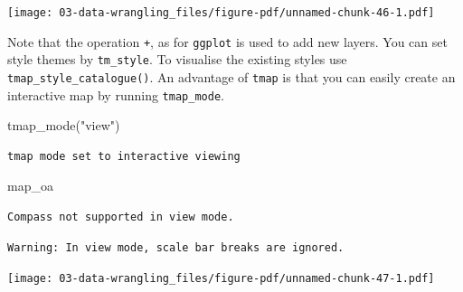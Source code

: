 \documentclass[
  letterpaper,
  DIV=11,
  numbers=noendperiod,
  oneside]{scrreprt}
\newenvironment{Shaded}{\begin{snugshade}}{\end{snugshade}}
\newcommand{\FunctionTok}[1]{\textcolor[rgb]{0.28,0.35,0.67}{#1}}
\newcommand{\NormalTok}[1]{\textcolor[rgb]{0.00,0.23,0.31}{#1}}
\newcommand{\StringTok}[1]{\textcolor[rgb]{0.13,0.47,0.30}{#1}}
\begin{document}
\texttt{[image: 03-data-wrangling\_files/figure-pdf/unnamed-chunk-46-1.pdf]}

Note that the operation \texttt{+}, as for \texttt{ggplot} is used to
add new layers. You can set style themes by \texttt{tm\_style}. To
visualise the existing styles use \texttt{tmap\_style\_catalogue()}. An
advantage of \texttt{tmap} is that you can easily create an interactive
map by running \texttt{tmap\_mode}.

\begin{Shaded}
\begin{Highlighting}[]
\FunctionTok{tmap\_mode}\NormalTok{(}\StringTok{"view"}\NormalTok{)}
\end{Highlighting}
\end{Shaded}

\begin{verbatim}
tmap mode set to interactive viewing
\end{verbatim}

\begin{Shaded}
\begin{Highlighting}[]
\NormalTok{map\_oa}
\end{Highlighting}
\end{Shaded}

\begin{verbatim}
Compass not supported in view mode.
\end{verbatim}

\begin{verbatim}
Warning: In view mode, scale bar breaks are ignored.
\end{verbatim}

\texttt{[image: 03-data-wrangling\_files/figure-pdf/unnamed-chunk-47-1.pdf]}

\end{document}
